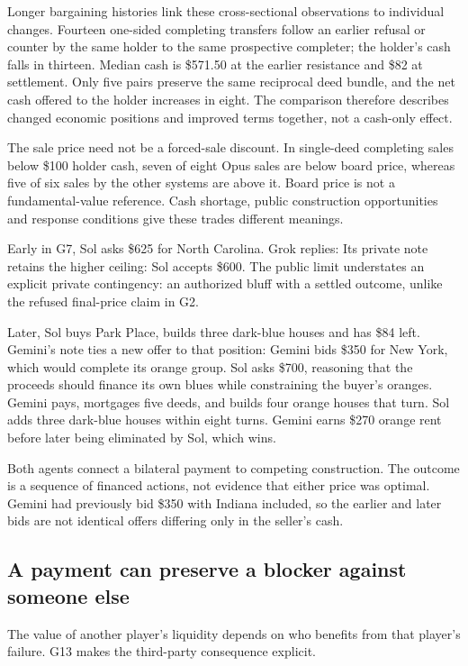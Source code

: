Longer bargaining histories link these cross-sectional observations to individual changes. Fourteen one-sided completing transfers follow an earlier refusal or counter by the same holder to the same prospective completer; the holder's cash falls in thirteen. Median cash is \$571.50 at the earlier resistance and \$82 at settlement. Only five pairs preserve the same reciprocal deed bundle, and the net cash offered to the holder increases in eight. The comparison therefore describes changed economic positions and improved terms together, not a cash-only effect.

The sale price need not be a forced-sale discount. In single-deed completing sales below \$100 holder cash, seven of eight Opus sales are below board price, whereas five of six sales by the other systems are above it. Board price is not a fundamental-value reference. Cash shortage, public construction opportunities and response conditions give these trades different meanings.

Early in G7, Sol asks \$625 for North Carolina. Grok replies:
Its private note retains the higher ceiling:
Sol accepts \$600. The public limit understates an explicit private contingency: an authorized bluff with a settled outcome, unlike the refused final-price claim in G2.

Later, Sol buys Park Place, builds three dark-blue houses and has \$84 left. Gemini's note ties a new offer to that position:
Gemini bids \$350 for New York, which would complete its orange group. Sol asks \$700, reasoning that the proceeds should finance its own blues while constraining the buyer's oranges. Gemini pays, mortgages five deeds, and builds four orange houses that turn. Sol adds three dark-blue houses within eight turns. Gemini earns \$270 orange rent before later being eliminated by Sol, which wins.

Both agents connect a bilateral payment to competing construction. The outcome is a sequence of financed actions, not evidence that either price was optimal. Gemini had previously bid \$350 with Indiana included, so the earlier and later bids are not identical offers differing only in the seller's cash.

\subsection{A payment can preserve a blocker against someone else}
The value of another player's liquidity depends on who benefits from that player's failure. G13 makes the third-party consequence explicit.

